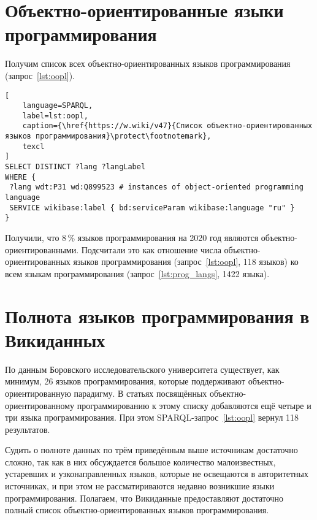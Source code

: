 \newpage
\section{Объектно-ориентированные языки программирования}
Получим список всех объектно-ориентированных языков программирования (запрос~\ref{lst:oopl}).

\begin{lstlisting}[
	language=SPARQL,
	label=lst:oopl,
	caption={\href{https://w.wiki/v47}{Список объектно-ориентированных языков программирования}\protect\footnotemark},
	texcl
]
SELECT DISTINCT ?lang ?langLabel
WHERE {
 ?lang wdt:P31 wd:Q899523 # instances of object-oriented programming language
 SERVICE wikibase:label { bd:serviceParam wikibase:language "ru" }
}
\end{lstlisting}

Получили, что 8\,\% языков программирования на 2020 год являются объектно-ориентированными. 
Подсчитали это как отношение числа объектно-ориентированных языков программирования 
(запрос~\ref{lst:oopl}, 118 языков) ко всем языкам программирования (запрос~\ref{lst:prog_langs}, 1422 языка).




\section{Полнота языков программирования в Викиданных}
По данным Боровского исследовательского университета\autocite{oo_langs_bourabai} существует, как минимум, 26 языков программирования, которые поддерживают объектно-ориентированную парадигму. В статьях посвящённых объектно-ориентированному программированию к этому списку добавляются ещё четыре\autocite{oo_langs_science_wikia} и три\autocite{oo_langs_garshin} языка программирования. При этом SPARQL-запрос~\ref{lst:oopl} вернул 118 результатов.

Судить о полноте данных по трём приведённым выше источникам достаточно сложно, так как в них обсуждается большое количество малоизвестных, устаревших и узконаправленных языков, которые не освещаются в авторитетных источниках, и при этом не рассматириваются недавно возникшие языки программирования. 
Полагаем, что Викиданные предоставляют достаточно полный список объектно-ориентированных языков программирования.



